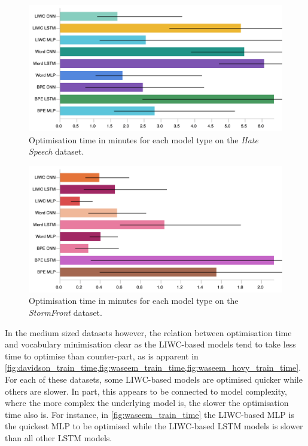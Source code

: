 \begin{figure}[h]
    \centering
    \includegraphics[width=\textwidth]{waseem_hovy_train_time.pdf}
    \caption{Optimisation time in minutes for each model type on the \textit{Hate Speech} dataset.}
    \label{fig:waseem_hovy_train_time}
\end{figure}
\begin{figure}[h]
  \centering
  \includegraphics[width=\textwidth]{garcia_train_time.pdf}
  \caption{Optimisation time in minutes for each model type on the \textit{StormFront} dataset.}
  \label{fig:garcia_train_time}
\end{figure}

In the medium sized datasets however, the relation between optimisation time and vocabulary minimisation  clear as the LIWC-based models tend to take less time to optimise than counter-part, as is apparent  in \cref{fig:davidson_train_time,fig:waseem_train_time,fig:waseem_hovy_train_time}.
For each of these datasets, some LIWC-based models are optimised quicker while others are slower.
In part, this appears to be connected to model complexity, where the more complex the underlying model is, the slower the optimisation time also is.
For instance, in  \cref{fig:waseem_train_time} the LIWC-based MLP is the quickest MLP to be optimised while the LIWC-based LSTM models is slower than all other LSTM models.

